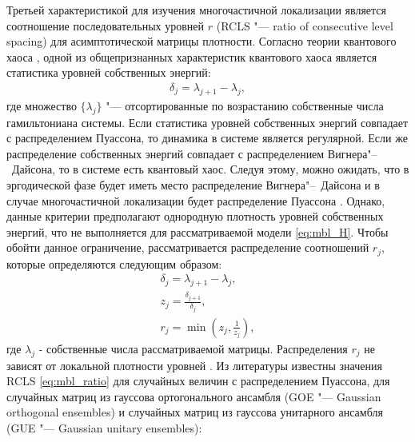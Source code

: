 Третьей характеристикой для изучения многочастичной локализации является соотношение последовательных уровней \(r\) (RCLS "--- ratio of consecutive level spacing) для асимптотической матрицы плотности.
Согласно теории квантового хаоса \cite{Haake2018}, одной из общепризнанных характеристик квантового хаоса является статистика уровней собственных энергий:
\begin{equation}
	\label{eq:mbl_energy_levels}
	\begin{gathered}
		\delta_j = \lambda_{j+1} - \lambda_{j}, 
	\end{gathered}
\end{equation}
где множество \(\{\lambda_j\}\) "--- отсортированные по возрастанию собственные числа гамильтониана системы.
Если статистика уровней собственных энергий совпадает с распределением Пуассона, то динамика в системе является регулярной.
Если же распределение собственных энергий совпадает с распределением Вигнера"--~Дайсона, то в системе есть квантовый хаос.
Следуя этому, можно ожидать, что в эргодической фазе будет иметь место распределение Вигнера"--~Дайсона и в случае многочастичной локализации будет распределение Пуассона \cite{Oganesyan2007, Serbyn2016}.
Однако, данные критерии предполагают однородную плотность уровней собственных энергий, что не выполняется для рассматриваемой модели \cref{eq:mbl_H}.
Чтобы обойти данное ограничение, рассматривается распределение соотношений \(r_j\), которые определяются следующим образом:
\begin{equation}
	\label{eq:mbl_ratio}
	\begin{gathered}
		\delta_j = \lambda_{j+1} - \lambda_{j}, \\
		z_j = \frac{\delta_{j+1}}{\delta_{j}}, \\
		r_j = \min\left(z_j, \frac{1}{z_j} \right),
	\end{gathered}
\end{equation}
где \(\lambda_{j}\) - собственные числа рассматриваемой матрицы. 
Распределения \(r_j\) не зависят от локальной плотности уровней \cite{Oganesyan2007}.
Из литературы \cite{Atas2013} известны значения RCLS \cref{eq:mbl_ratio} для случайных величин с распределением Пуассона, для случайных матриц \cite{mehta2004random} из гауссова ортогонального ансамбля (GOE "--- Gaussian orthogonal ensembles) и случайных матриц из гауссова унитарного ансамбля (GUE "--- Gaussian unitary ensembles):


